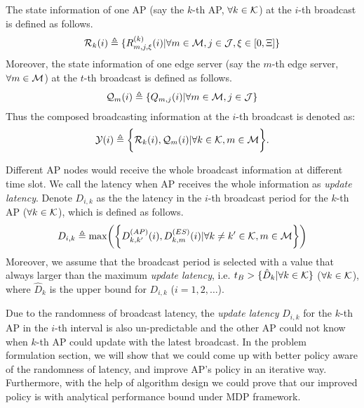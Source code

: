 The state information of one AP (say the $k$-th AP, $\forall k\in\mathcal{K}$) at the $i$-th broadcast is defined as follows.
\begin{align}
    \mathcal{R}_{k}(i) \triangleq \{R^{(k)}_{m,j,\xi}(i) | \forall m\in\mathcal{M}, j\in\mathcal{J}, \xi \in [0,\Xi]\}
\end{align}
Moreover, the state information of one edge server (say the $m$-th edge server, $\forall m\in\mathcal{M}$) at the $t$-th broadcast is defined as follows.
\begin{align}
    \mathcal{Q}_{m}(i) \triangleq \{Q_{m,j}(i) | \forall m\in\mathcal{M}, j\in\mathcal{J}\}
\end{align}
Thus the composed broadcasting information at the $i$-th broadcast is denoted as:
\begin{align}
    \mathcal{Y}(i) \triangleq
        \bigg\{
            \mathcal{R}_{k}(i), \mathcal{Q}_{m}(i) | \forall k\in\mathcal{K}, m\in\mathcal{M}
        \bigg\}.
\end{align}

Different AP nodes would receive the whole broadcast information at different time slot.
We call the latency when AP receives the whole information as \emph{update latency}.
Denote $D_{i,k}$ as the the latency in the $i$-th broadcast period for the $k$-th AP ($\forall k\in\mathcal{K}$), which is defined as follows.
\begin{align}
    D_{i,k} \define \max\Paren{\Brace{
        D^{(AP)}_{k,k'}(i),
        D^{(ES)}_{k,m}(i) | \forall k \neq k' \in \apSet, m\in\esSet
    }}
\end{align}
Moreover, we assume that the broadcast period is selected with a value that always larger than the maximum \emph{update latency}, i.e. $t_B > \{\hat{D}_k|\forall k\in\mathcal{K}\}$ ($\forall k\in\mathcal{K}$), where $\hat{D}_k$ is the upper bound for $D_{i,k}$ ($i=1,2,\dots$).

Due to the randomness of broadcast latency, the \emph{update latency} $D_{i,k}$ for the $k$-th AP in the $i$-th interval is also un-predictable and the other AP could not know when $k$-th AP could update with the latest broadcast.
In the problem formulation section, we will show that we could come up with better policy aware of the randomness of latency, and improve AP's policy in an iterative way.
Furthermore, with the help of algorithm design we could prove that our improved policy is with analytical performance bound under MDP framework.

